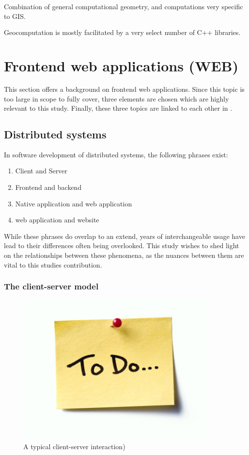 Combination of general computational geometry, and computations very specific to GIS.

Geocomputation is mostly facilitated by a very select number of C++ libraries. 

\section{Frontend web applications (WEB) }
\label{sec:background-web}

This section offers a background on frontend web applications.
Since this topic is too large in scope to fully cover, three elements are chosen which are highly relevant to this study.
Finally, these three topics are linked to each other in .

\subsection{Distributed systems}
\label{sec:background-web-terminology}

In software development of distributed systems, the following phrases exist: 
\begin{enumerate}[-]
  \item Client and Server 
  \item Frontend and backend
  \item Native application and web application
  \item web application and website
\end{enumerate}
While these phrases do overlap to an extend, years of interchangeable usage have lead to their differences often being overlooked. 
This study wishes to shed light on the relationships between these phenomena, as the nuances between them are vital to this studies contribution.

\subsubsection*{The client-server model}

\begin{figure}
  \centering
  \graphicspath{ {../../assets/images/misc/} }
  \includegraphics[width=380px]{todo.jpg}
  \caption{A typical client-server interaction) }
  \label{fig:client-server}
\end{figure}

